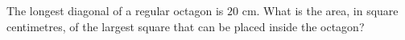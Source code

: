 The longest diagonal of a regular octagon is $20$ cm. What is the area, in square centimetres, of the largest square that can be placed inside the octagon?
